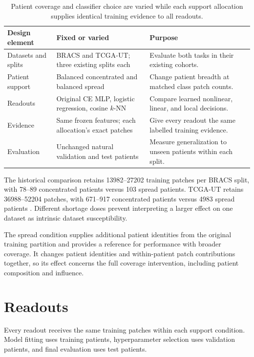 \documentclass[11pt]{article}
\begin{document}
\begin{table}[htbp]
\centering
\small
\renewcommand{\arraystretch}{1.15}
\begin{tabularx}{\textwidth}{@{}p{}XX@{}}
\toprule
Design element & Fixed or varied & Purpose \\
\midrule
Datasets and splits & BRACS and TCGA-UT; three existing splits each & Evaluate both tasks in their existing cohorts. \\
Patient support & Balanced concentrated and balanced spread & Change patient breadth at matched class patch counts. \\
Readouts & Original CE MLP, logistic regression, cosine \(k\)-NN & Compare learned nonlinear, linear, and local decisions. \\
Evidence & Same frozen features; each allocation's exact patches & Give every readout the same labelled training evidence. \\
Evaluation & Unchanged natural validation and test patients & Measure generalization to unseen patients within each split. \\
\bottomrule
\end{tabularx}
\caption{Patient coverage and classifier choice are varied while each support allocation supplies identical training evidence to all readouts.}
\label{tab:design}
\end{table}

\noindent The historical comparison retains \num{13982}--\num{27202} training patches per BRACS split, with \num{78}--\num{89} concentrated patients versus \num{103} spread patients. TCGA-UT retains \num{36988}--\num{52204} patches, with \num{671}--\num{917} concentrated patients versus \num{4983} spread patients \citep{queisler2026benchmarkResults}. Different shortage doses prevent interpreting a larger effect on one dataset as intrinsic dataset susceptibility.

The spread condition supplies additional patient identities from the original training partition and provides a reference for performance with broader coverage. It changes patient identities and within-patient patch contributions together, so its effect concerns the full coverage intervention, including patient composition and influence.
\section{Readouts}
\label{sec:readouts}
Every readout receives the same training patches within each support condition. Model fitting uses training patients, hyperparameter selection uses validation patients, and final evaluation uses test patients.
\end{document}
